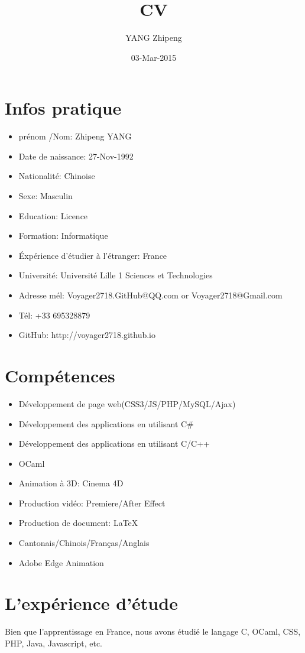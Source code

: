\documentclass[UTF8]{ctexart}
\title{CV}
\author{YANG Zhipeng}
\date{03-Mar-2015}
\begin{document}
\maketitle
\pagestyle{fancy}
\section{Infos pratique}
\begin{itemize}
\item pr\'enom /Nom: Zhipeng YANG
\item Date de naissance: 27-Nov-1992
\item Nationalit\'e: Chinoise
\item Sexe: Masculin
\item Education: Licence
\item Formation: Informatique
\item \'Exp\'erience d'\'etudier \`a l'\'etranger: France
\item Universit\'e: Universit\'e Lille 1 Sciences et Technologies
\item Adresse m\'el: Voyager2718.GitHub@QQ.com or Voyager2718@Gmail.com
\item T\'el: +33 695328879
\item GitHub: http://voyager2718.github.io
\end{itemize}
\section{Comp\'etences}
\begin{itemize}
\item D\'eveloppement de page web(CSS3/JS/PHP/MySQL/Ajax)
\item D\'eveloppement des applications en utilisant C\#{}
\item D\'eveloppement des applications en utilisant C/C++
\item OCaml
\item Animation \`a 3D: Cinema 4D
\item Production vid\'eo: Premiere/After Effect
\item Production de document: \LaTeX
\item Cantonais/Chinois/Fran\c{c}as/Anglais
\item Adobe Edge Animation
\end{itemize}
\section{L'exp\'erience d'\'etude}
Bien que l'apprentissage en France, nous avons \'etudi\'e le langage C, OCaml, CSS, PHP, Java, Javascript, etc.
\end{document}
